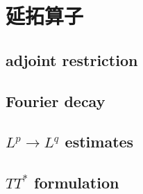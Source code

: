 \section{延拓算子}
\label{b2:sec:2303}


\subsection{adjoint restriction}
\label{b2:subsec:230301}

\subsection{Fourier decay}
\label{b2:subsec:230302}

\subsection{\texorpdfstring{\(L^p\to L^q\)}{Lp} estimates}
\label{b2:subsec:230303}

\subsection{\texorpdfstring{\(TT^*\)}{TT*} formulation}
\label{b2:subsec:230304}


